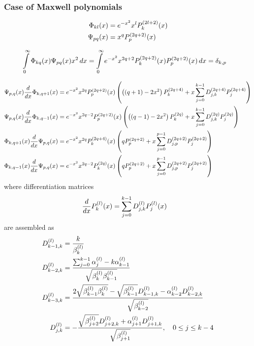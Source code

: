 \documentclass{article}[draft]
\begin{document}
\subsubsection{Case of Maxwell polynomials}

\begin{align*}
\Phi_{kl}\of{x} &= e^{-x^2} x^l \maxp{2l+2}{k}\of{x} \\
\Psi_{pq}\of{x} &= x^q \maxp{2q+2}{p}\of{x} 
\end{align*}

\begin{align*}
\myint_0^\infty \Phi_{kq}\of{x} \Psi_{pq}\of{x} x^2 \diff{x} 
&= \myint_0^\infty e^{-x^2} x^{2q+2}\maxp{2q+2}{k}\of{x} \maxp{2q+2}{p}\of{x} \diff{x}
= \delta_{k,p}
\end{align*}

\begin{align*}
\Psi_{p,q}\of{x} \frac{d}{dx} \Phi_{k,q+1}\of{x} 
&= e^{-x^2} x^{2q} \maxp{2q+2}{p}\of{x} 
\left( \left( (q+1) - 2x^2 \right) \maxp{2q+4}{k} + x \sum_{j=0}^{k-1} \diffm{2q+4}{j}{k} \maxp{2q+4}{j} \right)
\\
\Psi_{p,q}\of{x} \frac{d}{dx} \Phi_{k,q-1}\of{x} 
&= e^{-x^2} x^{2q-2} \maxp{2q+2}{p}\of{x} 
\left( \left( (q-1) - 2x^2 \right) \maxp{2q}{k} + x \sum_{j=0}^{k-1} \diffm{2q}{j}{k} \maxp{2q}{j} \right)
\\
\Phi_{k,q+1}\of{x} \frac{d}{dx} \Psi_{p,q}\of{x}
&= e^{-x^2} x^{2q} \maxp{2q+4}{k}\of{x} 
\left( q \maxp{2q+2}{p} + x \sum_{j=0}^{p-1} \diffm{2q+2}{j}{p} \maxp{2q+2}{j} \right)
\\
\Phi_{k,q-1}\of{x} \frac{d}{dx} \Psi_{p,q}\of{x}
&= e^{-x^2} x^{2q-2} \maxp{2q}{k}\of{x} 
\left( q \maxp{2q+2}{p} + x \sum_{j=0}^{p-1} \diffm{2q+2}{j}{p} \maxp{2q+2}{j} \right)
\end{align*}
where differentiation  matrices
\begin{align*}
\frac{d}{dx} \maxp{l}{k} \of{x} &= \sum_{j=0}^{k-1} \diffm{l}{j}{k} \maxp{l}{j}\of{x}
\end{align*}
are assembled as
\begin{align*}
D^{(l)}_{k-1,k} &= \frac{k}{\beta^{(l)}_k}
\\
D^{(l)}_{k-2,k} &= \frac{\sum_{j=0}^{k-1} \alpha^{(l)}_j - k \alpha^{(l)}_{k-1}}{\sqrt{\beta^{(l)}_k \beta^{(l)}_{k-1}}} 
\\
D^{(l)}_{k-3,k} &= \frac{2 \sqrt{\beta^{(l)}_{k-1} \beta^{(l)}_{k}} - \sqrt{\beta^{(l)}_{k-1}} D^{(l)}_{k-1,k} - \alpha^{(l)}_{k-2} D^{(l)}_{k-2,k} }{\sqrt{\beta^{(l)}_{k-2}}} 
\\
D^{(l)}_{j,k} &= -\frac{\sqrt{\beta^{(l)}_{j+2}} D^{(l)}_{j+2,k} + \alpha^{(l)}_{j+1} D^{(l)}_{j+1,k} }{\sqrt{\beta^{(l)}_{j+1}}}
,\quad 0 \leq j \leq k-4 
\end{align*}
\end{document}
